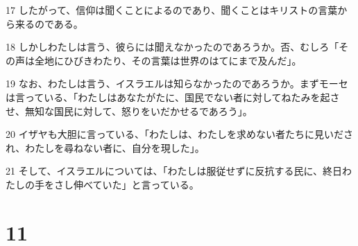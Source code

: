 \par 17 したがって、信仰は聞くことによるのであり、聞くことはキリストの言葉から来るのである。
\par 18 しかしわたしは言う、彼らには聞えなかったのであろうか。否、むしろ「その声は全地にひびきわたり、その言葉は世界のはてにまで及んだ」。
\par 19 なお、わたしは言う、イスラエルは知らなかったのであろうか。まずモーセは言っている、「わたしはあなたがたに、国民でない者に対してねたみを起させ、無知な国民に対して、怒りをいだかせるであろう」。
\par 20 イザヤも大胆に言っている、「わたしは、わたしを求めない者たちに見いだされ、わたしを尋ねない者に、自分を現した」。
\par 21 そして、イスラエルについては、「わたしは服従せずに反抗する民に、終日わたしの手をさし伸べていた」と言っている。

\chapter{11}

